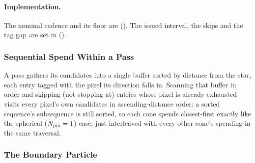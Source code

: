 \paragraph{Implementation.} The nominal cadence and its floor are
(). The issued
interval, the skips and the tag gap are set in
().

\subsubsection{Sequential Spend Within a Pass}

A pass gathers its candidates
into a single buffer sorted by distance from the star, each entry
tagged with the pixel its direction falls in. Scanning that buffer in
order and skipping (not stopping at) entries whose pixel is already
exhausted visits every pixel's own candidates in ascending-distance
order: a sorted sequence's subsequence is still sorted, so each
cone spends closest-first exactly like the spherical ($N_{\rm
pix}=1$) case, just interleaved with every other cone's spending in
the same traversal.

\subsubsection{The Boundary Particle}
\label{sec:boundary-particle}

